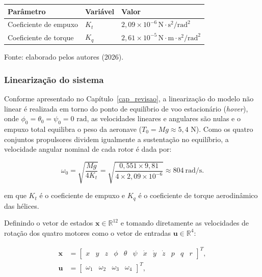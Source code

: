 \begin{quadro}[H]
\centering
\caption{Parâmetros aerodinâmicos das hélices.}
\label{qua:parametros_aerodinamicos}
\small
\renewcommand{\arraystretch}{1.3}
\begin{tabular}{|>{\raggedright\arraybackslash}p{4.8cm}|>{\centering\arraybackslash}p{2.5cm}|>{\centering\arraybackslash}p{5.5cm}|}
\hline
\textbf{Parâmetro} & \textbf{Variável} & \textbf{Valor} \\
\hline
Coeficiente de empuxo & $K_t$ & $2{,}09 \times 10^{-6} \mathrm{\, N\cdot s^2/rad^2}$ \\[4pt]
\hline
Coeficiente de torque & $K_q$ & $2{,}61 \times 10^{-5} \mathrm{\, N\cdot m\cdot s^2/rad^2}$ \\[4pt]
\hline
\end{tabular}
\par\vspace{0.2cm}
\footnotesize Fonte: elaborado pelos autores (2026).
\end{quadro}

\subsubsection{Linearização do sistema}\label{subsubsec:linearizacao_sistema}

Conforme apresentado no Capítulo~\ref{cap_revisao}, a linearização do modelo não linear é realizada em torno do ponto de equilíbrio de voo estacionário (\textit{hover}), onde $\phi_0 = \theta_0 = \psi_0 = 0\text{~rad}$, as velocidades lineares e angulares são nulas e o empuxo total equilibra o peso da aeronave ($T_0 = M g \approx 5{,}4\text{~N}$). Como os quatro conjuntos propulsores dividem igualmente a sustentação no equilíbrio, a velocidade angular nominal de cada rotor é dada por:

\begin{equation}\label{eq:omega_hover}
\omega_0 = \sqrt{\frac{M g}{4 K_t}} = \sqrt{\frac{0,551 \times 9{,}81}{4 \times 2{,}09 \times 10^{-6}}} \approx 804~\text{rad/s}.
\end{equation}

\noindent em que $K_t$ é o coeficiente de empuxo e $K_q$ é o coeficiente de torque aerodinâmico das hélices.

Definindo o vetor de estados $\mathbf{x} \in \mathbb{R}^{12}$ e tomando diretamente as velocidades de rotação dos quatro motores como o vetor de entradas $\mathbf{u} \in \mathbb{R}^{4}$:

\begin{equation}\label{eq:vetores_x_u_motores}
\begin{aligned}
\mathbf{x} &= \begin{bmatrix} x & y & z & \phi & \theta & \psi & \dot{x} & \dot{y} & \dot{z} & p & q & r \end{bmatrix}^T, \\
\mathbf{u} &= \begin{bmatrix} \omega_1 & \omega_2 & \omega_3 & \omega_4 \end{bmatrix}^T,
\end{aligned}
\end{equation}

